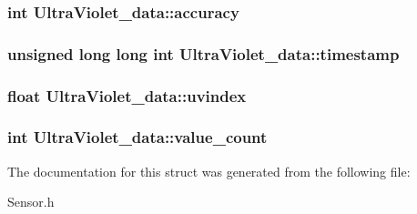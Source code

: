 \subsubsection[{accuracy}]{\setlength{\rightskip}{0pt plus 5cm}int Ultra\-Violet\-\_\-data\-::accuracy}\label{structUltraViolet__data_a65fcb870a5c67c956ea6e7f8040821d9}
\subsubsection[{timestamp}]{\setlength{\rightskip}{0pt plus 5cm}unsigned long long int Ultra\-Violet\-\_\-data\-::timestamp}\label{structUltraViolet__data_a676d3ccfcc6b156823b22286d75e230b}
\subsubsection[{uvindex}]{\setlength{\rightskip}{0pt plus 5cm}float Ultra\-Violet\-\_\-data\-::uvindex}\label{structUltraViolet__data_a7f11f20fcda81e9d4fa76ad1910d602f}
\subsubsection[{value\-\_\-count}]{\setlength{\rightskip}{0pt plus 5cm}int Ultra\-Violet\-\_\-data\-::value\-\_\-count}\label{structUltraViolet__data_a38ed7510ea67954b8fa44c5e329b4a34}


The documentation for this struct was generated from the following file\-:\begin{DoxyCompactItemize}
\item 
Sensor.\-h\end{DoxyCompactItemize}
